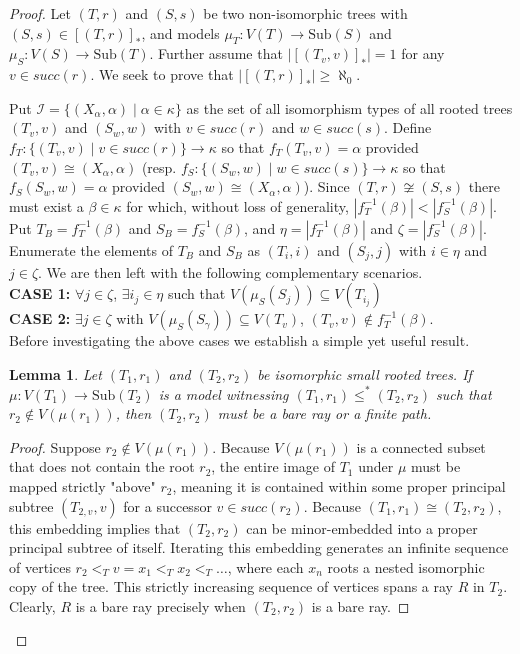 \documentclass[10pt,a4paper]{amsart}
\newtheorem{lemma}{Lemma}
\begin{document}
\begin{proof} Let $(T,r)$ and $(S,s)$ be two non-isomorphic trees with $(S,s)\in [(T,r)]_*$, and models $\mu_T: V(T) \to \text{Sub}(S)$ and $\mu_S: V(S) \to \text{Sub}(T)$. Further assume that $|[(T_v, v)]_*| =1$ for any $v \in succ(r)$. We seek to prove that $|[(T,r)]_*| \geq \aleph_0$. 

Put $\mathcal{I}= \{(X_\alpha,\alpha) \mid \alpha\in \kappa\}$  as the set of all isomorphism types of all rooted trees $(T_v,v)$ and $(S_w,w)$ with $v\in succ(r)$  and $w\in succ(s)$. Define $f_T: \{(T_v,v)\mid v\in succ(r)\} \to \kappa$ so that $f_T(T_v,v) = \alpha$ provided $(T_v,v) \cong (X_\alpha, \alpha)$ (resp. $f_S: \{(S_w,w)\mid w \in succ(s)\} \to \kappa$ so that $f_S(S_w, w) = \alpha$ provided $(S_w, w) \cong (X_\alpha, \alpha)$). Since $(T,r) \not \cong (S,s)$ there must exist a $\beta \in \kappa$ for which, without loss of generality, $ |f_T^{-1}(\beta)| < |f_S^{-1}(\beta)|$. Put $T_B = f_T^{-1}(\beta)$ and $S_B = f_S^{-1}(\beta)$, and $\eta = |f_T^{-1}(\beta)|$ and $\zeta = |f_S^{-1}(\beta)|$. Enumerate the elements of $T_B$ and $S_B$ as $(T_i,i)$ and $(S_j,j)$ with $i\in \eta$ and $j\in \zeta$. We are then left with the following complementary scenarios.\\



\noindent
{\bf CASE 1:} $\forall j \in \zeta$, $\exists i_j \in \eta$ such that $V(\mu_S(S_j)) \subseteq V(T_{i_j})$\\ 

\noindent
{\bf CASE 2:} $\exists j \in \zeta$ with $V(\mu_S(S_\gamma)) \subseteq V(T_v)$, $(T_v, v) \not \in f_T^{-1}(\beta)$. \\

Before investigating the above cases we establish a simple yet useful result.

\begin{lemma}\label{lem:root_anchor} Let $(T_1, r_1)$ and $(T_2, r_2)$ be isomorphic small rooted trees. If $\mu: V(T_1) \to \text{Sub}(T_2)$ is a model witnessing $(T_1, r_1) \leq^* (T_2, r_2)$ such that $r_2 \notin V(\mu(r_1))$, then $(T_2, r_2)$ must be a bare ray or a finite path.\end{lemma}\begin{proof}Suppose $r_2 \notin V(\mu(r_1))$. Because $V(\mu(r_1))$ is a connected subset that does not contain the root $r_2$, the entire image of $T_1$ under $\mu$ must be mapped strictly "above" $r_2$, meaning it is contained within some proper principal subtree $(T_{2,v}, v)$ for a successor $v \in succ(r_2)$. Because $(T_1, r_1) \cong (T_2, r_2)$, this embedding implies that $(T_2, r_2)$ can be minor-embedded into a proper principal subtree of itself. Iterating this embedding generates an infinite sequence of vertices $r_2 <_T v = x_1 <_T x_2 <_T \ldots$, where each $x_n$ roots a nested isomorphic copy of the tree. This strictly increasing sequence of vertices spans a ray $R$ in $T_2$. Clearly, $R$ is a bare ray precisely when $(T_2, r_2)$ is a bare ray.\end{proof}


\end{proof}
\end{document}
